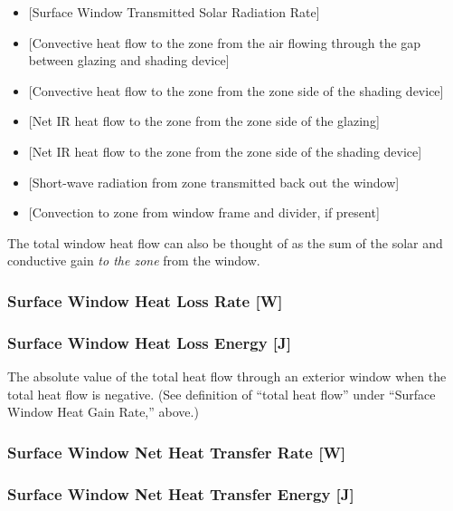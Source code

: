 \begin{itemize}
\item
  {[}Surface Window Transmitted Solar Radiation Rate{]}
\item
  {[}Convective heat flow to the zone from the air flowing through the gap between glazing and shading device{]}
\item
  {[}Convective heat flow to the zone from the zone side of the shading device{]}
\item
  {[}Net IR heat flow to the zone from the zone side of the glazing{]}
\item
  {[}Net IR heat flow to the zone from the zone side of the shading device{]}
\item
  {[}Short-wave radiation from zone transmitted back out the window{]}
\item
  {[}Convection to zone from window frame and divider, if present{]}
\end{itemize}

The total window heat flow can also be thought of as the sum of the solar and conductive gain \emph{to the zone} from the window.

\subsubsection{Surface Window Heat Loss Rate {[}W{]}}\label{surface-window-heat-loss-rate-w}

\subsubsection{Surface Window Heat Loss Energy {[}J{]}}\label{surface-window-heat-loss-energy-j}

The absolute value of the total heat flow through an exterior window when the total heat flow is negative. (See definition of ``total heat flow'' under ``Surface Window Heat Gain Rate,'' above.)

\subsubsection{Surface Window Net Heat Transfer Rate {[}W{]}}\label{surface-window-net-heat-transfer-rate-w}

\subsubsection{Surface Window Net Heat Transfer Energy {[}J{]}}\label{surface-window-net-heat-transfer-rate-j}

